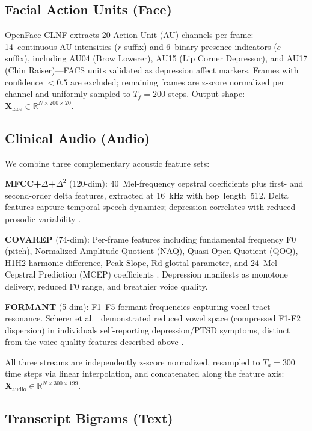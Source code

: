 \documentclass[5p,twocolumn]{elsarticle}
\begin{document}
\subsection{Facial Action Units (Face)}

OpenFace CLNF \cite{baltrusaitis2016} extracts 20 Action Unit (AU) channels
per frame: 14~continuous AU intensities ($r$ suffix) and 6~binary
presence indicators ($c$ suffix), including AU04 (Brow Lowerer),
AU15 (Lip Corner Depressor), and AU17 (Chin Raiser)---FACS units
\cite{ekman1978} validated as depression affect markers. Frames with confidence
$<0.5$ are excluded; remaining frames are z-score normalized
per channel and uniformly sampled to $T_f=200$ steps.
Output shape: $\mathbf{X}_\text{face}\in\mathbb{R}^{N\times200\times20}$.

\subsection{Clinical Audio (Audio)}

We combine three complementary acoustic feature sets:

\textbf{MFCC+$\Delta$+$\Delta^2$} (120-dim): 40~Mel-frequency
cepstral coefficients plus first- and second-order delta features,
extracted at 16~kHz with hop~length~512. Delta features capture
temporal speech dynamics; depression correlates with reduced prosodic
variability \cite{ringeval2017}.

\textbf{COVAREP} (74-dim): Per-frame features including fundamental
frequency F0 (pitch), Normalized Amplitude Quotient (NAQ), Quasi-Open
Quotient (QOQ), H1H2 harmonic difference, Peak Slope, Rd glottal
parameter, and 24~Mel Cepstral Prediction (MCEP) coefficients
\cite{covarep2014}. Depression manifests as monotone delivery,
reduced F0 range, and breathier voice quality.

\textbf{FORMANT} (5-dim): F1--F5 formant frequencies capturing
vocal tract resonance. Scherer et al.\ \cite{scherer2016vowel}
demonstrated reduced vowel space (compressed F1-F2 dispersion) in
individuals self-reporting depression/PTSD symptoms, distinct from
the voice-quality features described above \cite{scherer2013voice}.

All three streams are independently z-score normalized, resampled to
$T_a=300$ time steps via linear interpolation, and concatenated along
the feature axis:
$\mathbf{X}_\text{audio}\in\mathbb{R}^{N\times300\times199}$.

\subsection{Transcript Bigrams (Text)}
\end{document}
